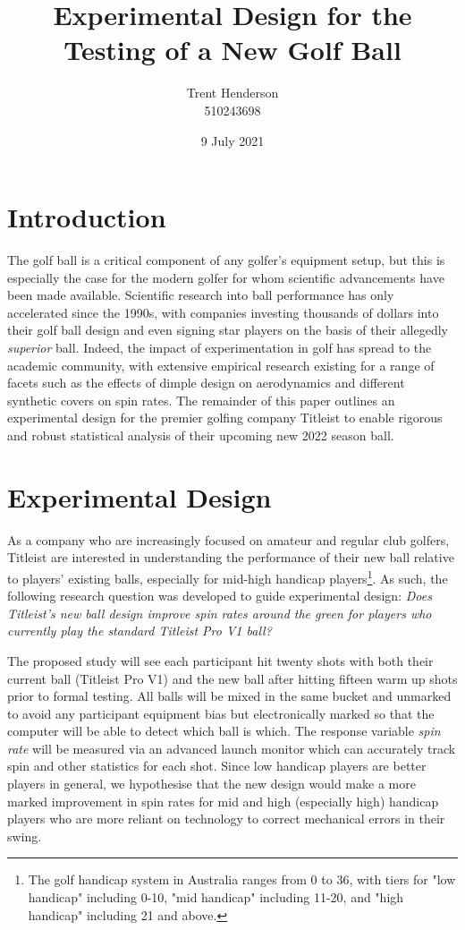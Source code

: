 \documentclass{article}
\begin{document}
\title{Experimental Design for the Testing of a New Golf Ball}
\author{Trent Henderson\\ 510243698}
\date{9 July 2021}

\maketitle

\section{Introduction}
The golf ball is a critical component of any golfer's equipment setup, but this is especially the case for the modern golfer for whom scientific advancements have been made available. 
Scientific research into ball performance has only accelerated since the 1990s, with companies investing thousands of dollars into their golf ball design and even signing star players on the basis of their allegedly \textit{superior} ball. 
Indeed, the impact of experimentation in golf has spread to the academic community, with extensive empirical research existing for a range of facets such as the effects of dimple design on aerodynamics and different synthetic covers on spin rates. 
The remainder of this paper outlines an experimental design for the premier golfing company Titleist to enable rigorous and robust statistical analysis of their upcoming new 2022 season ball.

\section{Experimental Design}
As a company who are increasingly focused on amateur and regular club golfers, Titleist are interested in understanding the performance of their new ball relative to players' existing balls, especially for mid-high handicap players\footnote{The golf handicap system in Australia ranges from 0 to 36, with tiers for "low handicap" including 0-10, "mid handicap" including 11-20, and "high handicap" including 21 and above.}. 
As such, the following research question was developed to guide experimental design: \textit{Does Titleist's new ball design improve spin rates around the green for players who currently play the standard Titleist Pro V1 ball?} 

The proposed study will see each participant hit twenty shots with both their current ball (Titleist Pro V1) and the new ball after hitting fifteen warm up shots prior to formal testing. 
All balls will be mixed in the same bucket and unmarked to avoid any participant equipment bias but electronically marked so that the computer will be able to detect which ball is which.
The response variable \textit{spin rate} will be measured via an advanced launch monitor which can accurately track spin and other statistics for each shot.
Since low handicap players are better players in general, we hypothesise that the new design would make a more marked improvement in spin rates for mid and high (especially high) handicap players who are more reliant on technology to correct mechanical errors in their swing.
\end{document}
